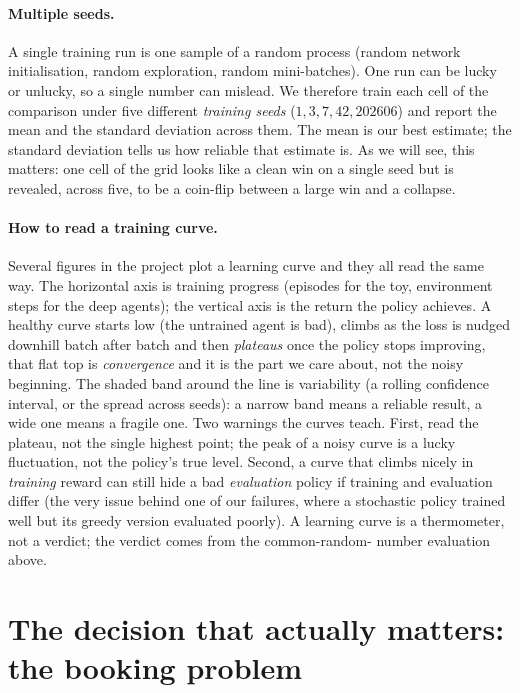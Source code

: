 \documentclass[11pt]{article}
\newcommand{\key}[1]{\textit{#1}}            %
\begin{document}
\paragraph{Multiple seeds.} A single training run is one sample of a random process (random
network initialisation, random exploration, random mini-batches). One run can be lucky or
unlucky, so a single number can mislead. We therefore train each cell of the comparison
under five different \key{training seeds} ($1, 3, 7, 42, 202606$) and report the mean and
the standard deviation across them. The mean is our best estimate; the standard deviation
tells us how reliable that estimate is. As we will see, this matters: one cell of the grid
looks like a clean win on a single seed but is revealed, across five, to be a coin-flip
between a large win and a collapse.

\paragraph{How to read a training curve.} Several figures in the project plot a learning
curve and they all read the same way. The horizontal axis is training progress (episodes
for the toy, environment steps for the deep agents); the vertical axis is the return the
policy achieves. A healthy curve starts low (the untrained agent is bad), climbs as the loss
is nudged downhill batch after batch and then \key{plateaus} once the policy stops
improving, that flat top is \key{convergence} and it is the part we care about, not the
noisy beginning. The shaded band around the line is variability (a rolling confidence
interval, or the spread across seeds): a narrow band means a reliable result, a wide one
means a fragile one. Two warnings the curves teach. First, read the plateau, not the single
highest point; the peak of a noisy curve is a lucky fluctuation, not the policy's true level.
Second, a curve that climbs nicely in \emph{training} reward can still hide a bad
\emph{evaluation} policy if training and evaluation differ (the very issue behind one of our
failures, where a stochastic policy trained well but its greedy version evaluated poorly).
A learning curve is a thermometer, not a verdict; the verdict comes from the common-random-
number evaluation above.

\section{The decision that actually matters: the booking problem}
\end{document}
